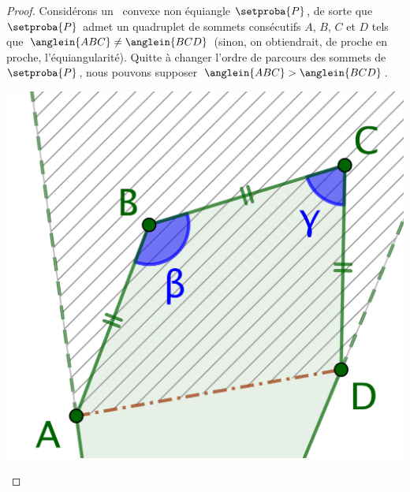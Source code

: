 \begin{proof}
    Considérons un \nequi\ convexe non équiangle $\setproba{P}$,
    de sorte que $\setproba{P}$ admet un quadruplet de sommets consécutifs $A$, $B$, $C$ et $D$ tels que $\anglein{ABC} \neq \anglein{BCD}$
    (sinon, on obtiendrait, de proche en proche, l'équiangularité).
    Quitte à changer l'ordre de parcours des sommets de $\setproba{P}$, nous pouvons supposer $\anglein{ABC} > \anglein{BCD}$.
    \begin{center}
        \includegraphics[scale=.4]{content/polygon/sol-must-be/2-eq-angles-start.png}
    \end{center}


\end{proof}
